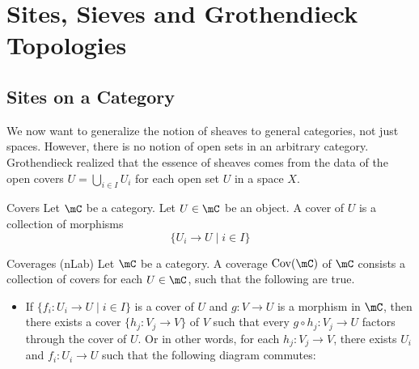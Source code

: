 \documentclass[a4paper]{article}
\begin{document}
\pagebreak
\section{Sites, Sieves and Grothendieck Topologies}
\subsection{Sites on a Category}
We now want to generalize the notion of sheaves to general categories, not just spaces. However, there is no notion of open sets in an arbitrary category. Grothendieck realized that the essence of sheaves comes from the data of the open covers $U=\bigcup_{i\in I}U_i$ for each open set $U$ in a space $X$. 

\begin{defn}{Covers}{} Let $\mC$ be a category. Let $U\in\mC$ be an object. A cover of $U$ is a collection of morphisms $$\{U_i\to U\;|\;i\in I\}$$
\end{defn}

\begin{defn}{Coverages (nLab)}{} Let $\mC$ be a category. A coverage $\text{Cov}(\mC)$ of $\mC$ consists a collection of covers for each $U\in\mC$, such that the following are true. 
\begin{itemize}
\item If $\{f_i:U_i\to U\;|\;i\in I\}$ is a cover of $U$ and $g:V\to U$ is a morphism in $\mC$, then there exists a cover $\{h_j:V_j\to V\}$ of $V$ such that every $g\circ h_j:V_j\to U$ factors through the cover of $U$. Or in other words, for each $h_j:V_j\to V$, there exists $U_i$ and $f_i:U_i\to U$ such that the following diagram commutes: \\~\\
\\~\\
\end{itemize}
\end{defn}
\end{document}
